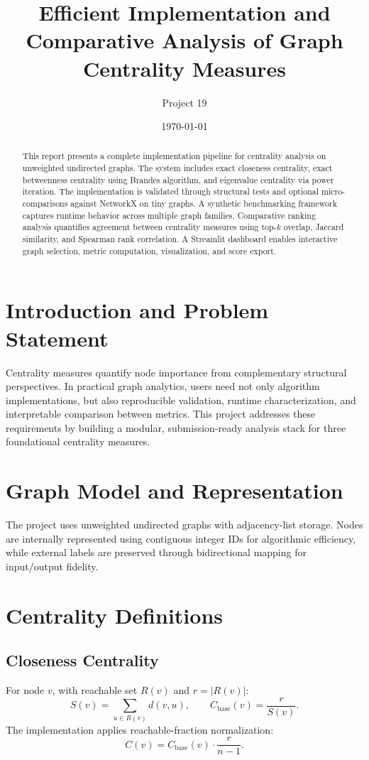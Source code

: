 \documentclass[11pt]{article}
\title{Efficient Implementation and Comparative Analysis of Graph Centrality Measures}
\author{Project 19}
\date{\today}
\begin{document}
\maketitle

\begin{abstract}
This report presents a complete implementation pipeline for centrality analysis on unweighted undirected graphs. The system includes exact closeness centrality, exact betweenness centrality using Brandes algorithm, and eigenvalue centrality via power iteration. The implementation is validated through structural tests and optional micro-comparisons against NetworkX on tiny graphs. A synthetic benchmarking framework captures runtime behavior across multiple graph families. Comparative ranking analysis quantifies agreement between centrality measures using top-$k$ overlap, Jaccard similarity, and Spearman rank correlation. A Streamlit dashboard enables interactive graph selection, metric computation, visualization, and score export.
\end{abstract}

\section{Introduction and Problem Statement}
Centrality measures quantify node importance from complementary structural perspectives. In practical graph analytics, users need not only algorithm implementations, but also reproducible validation, runtime characterization, and interpretable comparison between metrics. This project addresses these requirements by building a modular, submission-ready analysis stack for three foundational centrality measures.

\section{Graph Model and Representation}
The project uses unweighted undirected graphs with adjacency-list storage. Nodes are internally represented using contiguous integer IDs for algorithmic efficiency, while external labels are preserved through bidirectional mapping for input/output fidelity.

\section{Centrality Definitions}
\subsection{Closeness Centrality}
For node $v$, with reachable set $R(v)$ and $r=|R(v)|$:
\[
S(v)=\sum_{u\in R(v)} d(v,u), \qquad C_{\mathrm{base}}(v)=\frac{r}{S(v)}.
\]
The implementation applies reachable-fraction normalization:
\[
C(v)=C_{\mathrm{base}}(v)\cdot\frac{r}{n-1}.
\]
\end{document}
